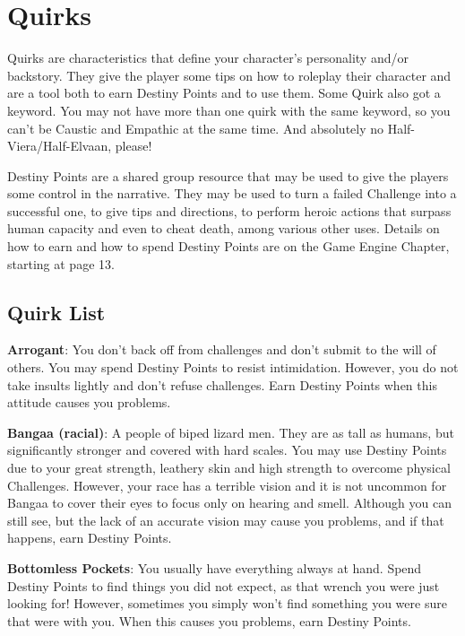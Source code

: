 \section{Quirks}
\begin{multicols}{2}
Quirks are characteristics that define your
character's personality and/or backstory. They
give the player some tips on how to roleplay their
character and are a tool both to earn Destiny
Points and to use them. Some Quirk also got a
keyword. You may not have more than one quirk
with the same keyword, so you can't be Caustic
and Empathic at the same time. And absolutely no
Half-Viera/Half-Elvaan, please!

Destiny Points are a shared group resource
that may be used to give the players some control
in the narrative. They may be used to turn a failed
Challenge into a successful one, to give tips and
directions, to perform heroic actions that surpass
human capacity and even to cheat death, among
various other uses. Details on how to earn and how
to spend Destiny Points are on the Game Engine
Chapter, starting at page 13.

\subsection{Quirk List}

\textbf{Arrogant}: You don’t back off from
challenges and don’t submit to the will of others.
You may spend Destiny Points to resist
intimidation. However, you do not take insults
lightly and don’t refuse challenges. Earn Destiny
Points when this attitude causes you problems.

\textbf{Bangaa (racial)}: A people of biped
lizard men. They are as tall as humans,
but significantly stronger and
covered with hard scales. You may use
Destiny Points due to your great strength,
leathery skin and high strength to overcome physical
Challenges.
However, your race has a terrible vision and it is
not uncommon for Bangaa to cover their eyes to
focus only on hearing and smell. Although you can
still see, but the lack of an accurate vision may
cause you problems, and if that happens, earn
Destiny Points.

\textbf{Bottomless Pockets}: You usually have
everything always at hand. Spend Destiny Points to
find things you did not expect, as that wrench you
were just looking for! However, sometimes you
simply won’t find something you were sure that
were with you. When this causes you problems,
earn Destiny Points.


\end{multicols}
